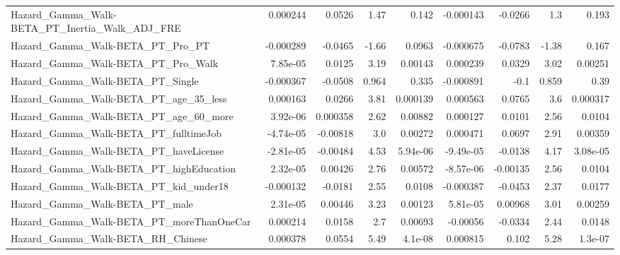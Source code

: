 \begin{tabular}{lrrrrrrrr}
Hazard\_Gamma\_Walk-BETA\_PT\_Inertia\_Walk\_ADJ\_FRE     &    0.000244 &       0.0526 &     1.47 &    0.142 &  -0.000143 &     -0.0266 &          1.3 &         0.193 \\
Hazard\_Gamma\_Walk-BETA\_PT\_Pro\_PT                   &   -0.000289 &      -0.0465 &    -1.66 &   0.0963 &  -0.000675 &     -0.0783 &        -1.38 &         0.167 \\
Hazard\_Gamma\_Walk-BETA\_PT\_Pro\_Walk                 &    7.85e-05 &       0.0125 &     3.19 &  0.00143 &   0.000239 &      0.0329 &         3.02 &       0.00251 \\
Hazard\_Gamma\_Walk-BETA\_PT\_Single                   &   -0.000367 &      -0.0508 &    0.964 &    0.335 &  -0.000891 &        -0.1 &        0.859 &          0.39 \\
Hazard\_Gamma\_Walk-BETA\_PT\_age\_35\_less              &    0.000163 &       0.0266 &     3.81 & 0.000139 &   0.000563 &      0.0765 &          3.6 &      0.000317 \\
Hazard\_Gamma\_Walk-BETA\_PT\_age\_60\_more              &    3.92e-06 &     0.000358 &     2.62 &  0.00882 &   0.000127 &      0.0101 &         2.56 &        0.0104 \\
Hazard\_Gamma\_Walk-BETA\_PT\_fulltimeJob              &   -4.74e-05 &     -0.00818 &      3.0 &  0.00272 &   0.000471 &      0.0697 &         2.91 &       0.00359 \\
Hazard\_Gamma\_Walk-BETA\_PT\_haveLicense              &   -2.81e-05 &     -0.00484 &     4.53 & 5.94e-06 &  -9.49e-05 &     -0.0138 &         4.17 &      3.08e-05 \\
Hazard\_Gamma\_Walk-BETA\_PT\_highEducation            &    2.32e-05 &      0.00426 &     2.76 &  0.00572 &  -8.57e-06 &    -0.00135 &         2.56 &        0.0104 \\
Hazard\_Gamma\_Walk-BETA\_PT\_kid\_under18              &   -0.000132 &      -0.0181 &     2.55 &   0.0108 &  -0.000387 &     -0.0453 &         2.37 &        0.0177 \\
Hazard\_Gamma\_Walk-BETA\_PT\_male                     &    2.31e-05 &      0.00446 &     3.23 &  0.00123 &   5.81e-05 &     0.00968 &         3.01 &       0.00259 \\
Hazard\_Gamma\_Walk-BETA\_PT\_moreThanOneCar           &    0.000214 &       0.0158 &      2.7 &  0.00693 &   -0.00056 &     -0.0334 &         2.44 &        0.0148 \\
Hazard\_Gamma\_Walk-BETA\_RH\_Chinese                  &    0.000378 &       0.0554 &     5.49 &  4.1e-08 &   0.000815 &       0.102 &         5.28 &       1.3e-07 \\

\end{tabular}
